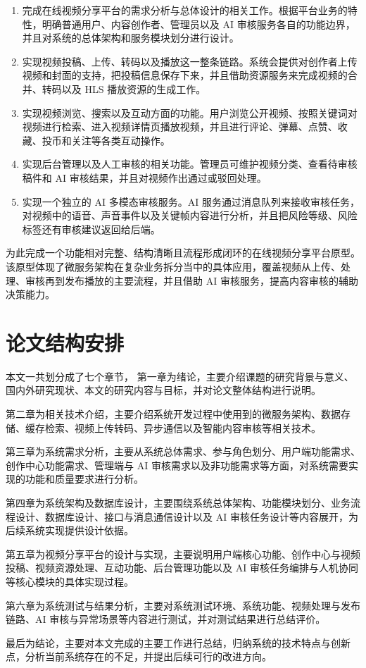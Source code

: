 \begin{enumerate}
\item 完成在线视频分享平台的需求分析与总体设计的相关工作。根据平台业务的特性，明确普通用户、内容创作者、管理员以及 AI 审核服务各自的功能边界，并且对系统的总体架构和服务模块划分进行设计。
\item 实现视频投稿、上传、转码以及播放这一整条链路。系统会提供对创作者上传视频和封面的支持，把投稿信息保存下来，并且借助资源服务来完成视频的合并、转码以及 HLS 播放资源的生成工作\cite{ffmpegdocs,rfc8216hls}。
\item 实现视频浏览、搜索以及互动方面的功能。用户浏览公开视频、按照关键词对视频进行检索、进入视频详情页播放视频，并且进行评论、弹幕、点赞、收藏、投币和关注等各类互动操作。
\item 实现后台管理以及人工审核的相关功能。管理员可维护视频分类、查看待审核稿件和 AI 审核结果，并且对视频作出通过或驳回处理。
\item 实现一个独立的 AI 多模态审核服务。AI 服务通过消息队列来接收审核任务，对视频中的语音、声音事件以及关键帧内容进行分析，并且把风险等级、风险标签还有审核建议返回给后端\cite{rabbitmqdocs,radford2023whisper,bai2023qwen,fastapidocs}。
\end{enumerate}

为此完成一个功能相对完整、结构清晰且流程形成闭环的在线视频分享平台原型。该原型体现了微服务架构在复杂业务拆分当中的具体应用，覆盖视频从上传、处理、审核再到发布播放的主要流程，并且借助 AI 审核服务，提高内容审核的辅助决策能力。

\section{论文结构安排}
\label{sec:thesis-structure}

本文一共划分成了七个章节，
第一章为绪论，主要介绍课题的研究背景与意义、国内外研究现状、本文的研究内容与目标，并对论文整体结构进行说明。

第二章为相关技术介绍，主要介绍系统开发过程中使用到的微服务架构、数据存储、缓存检索、视频上传转码、异步通信以及智能内容审核等相关技术。

第三章为系统需求分析，主要从系统总体需求、参与角色划分、用户端功能需求、创作中心功能需求、管理端与 AI 审核需求以及非功能需求等方面，对系统需要实现的功能和质量要求进行分析。

第四章为系统架构及数据库设计，主要围绕系统总体架构、功能模块划分、业务流程设计、数据库设计、接口与消息通信设计以及 AI 审核任务设计等内容展开，为后续系统实现提供设计依据。

第五章为视频分享平台的设计与实现，主要说明用户端核心功能、创作中心与视频投稿、视频资源处理、互动功能、后台管理功能以及 AI 审核任务编排与人机协同等核心模块的具体实现过程。

第六章为系统测试与结果分析，主要对系统测试环境、系统功能、视频处理与发布链路、AI 审核与异常场景等内容进行测试，并对测试结果进行总结评价。

最后为结论，主要对本文完成的主要工作进行总结，归纳系统的技术特点与创新点，分析当前系统存在的不足，并提出后续可行的改进方向。
